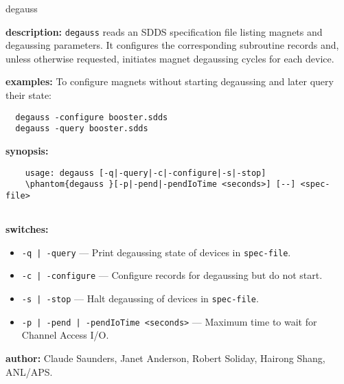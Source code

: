 \begin{sddsprog}{degauss}
\item \textbf{description:}
\verb+degauss+ reads an SDDS specification file listing magnets and degaussing parameters.
It configures the corresponding subroutine records and, unless otherwise requested, initiates
magnet degaussing cycles for each device.
\item \textbf{examples:}
To configure magnets without starting degaussing and later query their state:
\begin{verbatim}
  degauss -configure booster.sdds
  degauss -query booster.sdds
\end{verbatim}
\item \textbf{synopsis:}
  \begin{verbatim}
    usage: degauss [-q|-query|-c|-configure|-s|-stop]
    \phantom{degauss }[-p|-pend|-pendIoTime <seconds>] [--] <spec-file>
  
\end{verbatim}
\item \textbf{switches:}
\begin{itemize}
  \item {\tt -q\,|\,-query} --- Print degaussing state of devices in {\tt spec-file}.
  \item {\tt -c\,|\,-configure} --- Configure records for degaussing but do not start.
  \item {\tt -s\,|\,-stop} --- Halt degaussing of devices in {\tt spec-file}.
  \item {\tt -p\,|\,-pend\,|\,-pendIoTime <seconds>} --- Maximum time to wait for Channel Access I/O.
\end{itemize}
\item \textbf{author:} Claude Saunders, Janet Anderson, Robert Soliday, Hairong Shang, ANL/APS.
\end{sddsprog}

